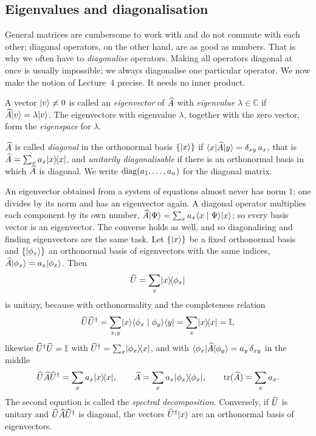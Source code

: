 \subsection{Eigenvalues and diagonalisation}
General matrices are cumbersome to work with and do not commute with each other; diagonal operators, on the other hand, are as good as numbers. That is why we often have to \emph{diagonalise} operators. Making all operators diagonal at once is usually impossible; we always diagonalise one particular operator. We now make the notion of Lecture~4 precise. It needs no inner product.
\begin{definition}
	A vector $\lvert v \rangle\neq 0$ is called an \emph{eigenvector} of $\widehat{A}$ with \emph{eigenvalue} $\lambda\in\mathbb{C}$ if $\widehat{A}\lvert v \rangle = \lambda\lvert v \rangle$. The eigenvectors with eigenvalue $\lambda$, together with the zero vector, form the \emph{eigenspace} for $\lambda$.

	$\widehat{A}$ is called \emph{diagonal} in the orthonormal basis $\{\lvert x \rangle\}$ if $\langle x \rvert \widehat{A} \lvert y \rangle = \delta_{xy}\,a_x$, that is $\widehat{A} = \sum_x a_x\lvert x \rangle\!\langle x \rvert$, and \emph{unitarily diagonalisable} if there is an orthonormal basis in which $\widehat{A}$ is diagonal. We write $\operatorname{diag}(a_1,\dots,a_n)$ for the diagonal matrix.
\end{definition}
An eigenvector obtained from a system of equations almost never has norm $1$; one divides by its norm and has an eigenvector again. A diagonal operator multiplies each component by its own number, $\widehat{A}\lvert \Psi \rangle = \sum_x a_x\langle x \mid \Psi \rangle\lvert x \rangle$; so every basis vector is an eigenvector. The converse holds as well, and so diagonalising and finding eigenvectors are the same task. Let $\{\lvert x \rangle\}$ be a fixed orthonormal basis and $\{\lvert \phi_x \rangle\}$ an orthonormal basis of eigenvectors with the same indices, $\widehat{A}\lvert \phi_x \rangle = a_x\lvert \phi_x \rangle$. Then
\begin{equation}
	\widehat{U} = \sum_x \lvert x \rangle\!\langle \phi_x \rvert
\end{equation}
is unitary, because with orthonormality and the completeness relation
\begin{equation}
	\widehat{U}\widehat{U}^{\dagger} = \sum_{x,y} \lvert x \rangle\langle \phi_x \mid \phi_y \rangle\langle y \rvert = \sum_x \lvert x \rangle\!\langle x \rvert = \mathbb{I},
\end{equation}
likewise $\widehat{U}^{\dagger}\widehat{U} = \mathbb{I}$ with $\widehat{U}^{\dagger} = \sum_x\lvert \phi_x \rangle\!\langle x \rvert$, and with $\langle \phi_x \rvert \widehat{A} \lvert \phi_y \rangle = a_y\,\delta_{xy}$ in the middle
\begin{equation}
	\widehat{U}\widehat{A}\widehat{U}^{\dagger} = \sum_x a_x \lvert x \rangle\!\langle x \rvert, \qquad
	\widehat{A} = \sum_x a_x \lvert \phi_x \rangle\!\langle \phi_x \rvert, \qquad
	\operatorname{tr}(\widehat{A}) = \sum_x a_x.
\end{equation}
The second equation is called the \emph{spectral decomposition}. Conversely, if $\widehat{U}$ is unitary and $\widehat{U}\widehat{A}\widehat{U}^{\dagger}$ is diagonal, the vectors $\widehat{U}^{\dagger}\lvert x \rangle$ are an orthonormal basis of eigenvectors.

